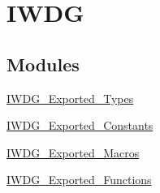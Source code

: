 \hypertarget{group__IWDG}{
\section{IWDG}
\label{group__IWDG}
}
\subsection*{Modules}
\begin{DoxyCompactItemize}
\item 
\hyperlink{group__IWDG__Exported__Types}{IWDG\_\-Exported\_\-Types}
\item 
\hyperlink{group__IWDG__Exported__Constants}{IWDG\_\-Exported\_\-Constants}
\item 
\hyperlink{group__IWDG__Exported__Macros}{IWDG\_\-Exported\_\-Macros}
\item 
\hyperlink{group__IWDG__Exported__Functions}{IWDG\_\-Exported\_\-Functions}
\end{DoxyCompactItemize}
